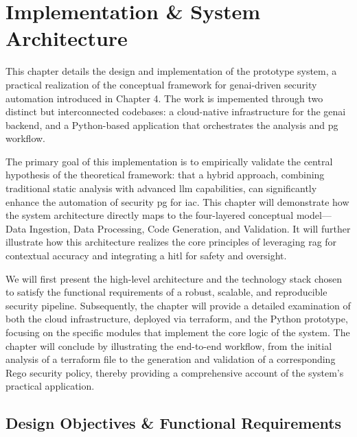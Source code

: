 \chapter{Implementation & System Architecture}


This chapter details the design and implementation of the prototype system, a practical realization of the conceptual framework for \gls{genai}-driven security automation introduced in Chapter 4. The work is impemented through two distinct but interconnected codebases: a cloud-native infrastructure for the \gls{genai} backend, and a Python-based application that orchestrates the analysis and \gls{pg} workflow.

The primary goal of this implementation is to empirically validate the central hypothesis of the theoretical framework: that a hybrid approach, combining traditional static analysis with advanced \gls{llm} capabilities, can significantly enhance the automation of security \gls{pg} for \gls{iac}. This chapter will demonstrate how the system architecture directly maps to the four-layered conceptual model—Data Ingestion, Data Processing, Code Generation, and Validation. It will further illustrate how this architecture realizes the core principles of leveraging \gls{rag} for contextual accuracy and integrating a \gls{hitl} for safety and oversight.

We will first present the high-level architecture and the technology stack chosen to satisfy the functional requirements of a robust, scalable, and reproducible security pipeline. Subsequently, the chapter will provide a detailed examination of both the cloud infrastructure, deployed via \gls{terraform}, and the Python prototype, focusing on the specific modules that implement the core logic of the system. The chapter will conclude by illustrating the end-to-end workflow, from the initial analysis of a \gls{terraform} file to the generation and validation of a corresponding Rego security policy, thereby providing a comprehensive account of the system's practical application.

\section{Design Objectives & Functional Requirements}



